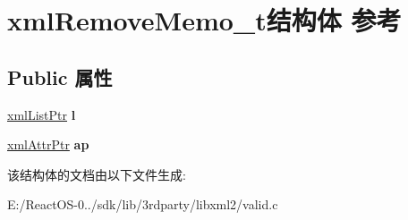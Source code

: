 \hypertarget{structxml_remove_memo__t}{}\section{xml\+Remove\+Memo\+\_\+t结构体 参考}
\label{structxml_remove_memo__t}
\subsection*{Public 属性}
\begin{DoxyCompactItemize}
\item 
\mbox{\label{structxml_remove_memo__t_a9cc6507efe7d2f04b07433f500fcad28}} 
\hyperlink{struct__xml_list}{xml\+List\+Ptr} {\bfseries l}
\item 
\mbox{\label{structxml_remove_memo__t_aea85ba9f1f0ced6b6a544ba95f5e2a36}} 
\hyperlink{struct__xml_attr}{xml\+Attr\+Ptr} {\bfseries ap}
\end{DoxyCompactItemize}


该结构体的文档由以下文件生成\+:\begin{DoxyCompactItemize}
\item 
E\+:/\+React\+O\+S-\/0../sdk/lib/3rdparty/libxml2/valid.\+c\end{DoxyCompactItemize}
